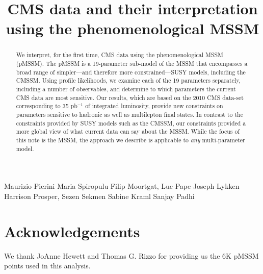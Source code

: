 \documentclass{cmspaper}
\begin{document}
%
\begin{titlepage}
\title{CMS data and their interpretation using the phenomenological MSSM}

  \begin{Authlist}
    Maurizio Pierini
    Maria Spiropulu
    Filip Moortgat, Luc Pape
    Joseph Lykken
    Harrison Prosper, Sezen Sekmen
    Sabine Kraml
    Sanjay Padhi
    
  \end{Authlist}

\begin{abstract}
We interpret, for the first time, CMS data using the phenomenological MSSM (pMSSM). The pMSSM is a 19-parameter sub-model of the MSSM that encompasses a broad range of simpler---and therefore more constrained---SUSY models, including the CMSSM. Using profile likelihoods, we examine
each of the 19 parameters separately, including a number of observables, and determine to which
parameters the current CMS data are most  sensitive. Our results, which are based on 
the 2010 CMS data-set corresponding to
35 pb$^{-1}$ of integrated luminosity, provide new constraints on 
parameters sensitive to hadronic as well as 
multilepton final states. In contrast to the constraints provided by SUSY models such as the CMSSM, 
our constraints provided a more global view of what current data can say about the MSSM. While
the focus of this note is the MSSM, the approach we describe is applicable to \emph{any} 
multi-parameter model.
\end{abstract}
\end{titlepage}









\section*{Acknowledgements}

We thank JoAnne Hewett and Thomas G. Rizzo for providing us the 6K pMSSM points used in this analysis.

\clearpage


\end{document}
